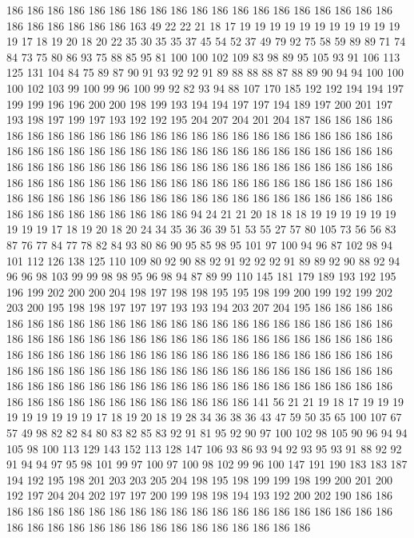 186 186 186 186 186 186 186 186 186 186 186 186 186 186 186 186 186 186 186 186
186 186 186 186 186 163 49 22 22 21 18 17 19 19 19 19 19 19 19 19
19 19 19 19 17 18 19 20 18 20 22 35 30 35 35 37 45 54 52 37
49 79 92 75 58 59 89 89 71 74 84 73 75 80 86 93 75 88 85 95
81 100 100 102 109 83 98 89 95 105 93 91 106 113 125 131 104 84 75 89
87 90 91 93 92 92 91 89 88 88 88 87 88 89 90 94 94 100 100 100
102 103 99 100 99 96 100 99 92 82 93 94 88 107 170 185 192 192 194 194
197 199 199 196 196 200 200 198 199 193 194 194 197 197 194 189 197 200 201 197
193 198 197 199 197 193 192 192 195 204 207 204 201 204 187 186 186 186 186 186
186 186 186 186 186 186 186 186 186 186 186 186 186 186 186 186 186 186 186 186
186 186 186 186 186 186 186 186 186 186 186 186 186 186 186 186 186 186 186 186
186 186 186 186 186 186 186 186 186 186 186 186 186 186 186 186 186 186 186 186
186 186 186 186 186 186 186 186 186 186 186 186 186 186 186 186 186 186 186 186
186 186 186 186 186 186 186 186 186 186 186 186 186 186 186 186 186 186 186 186
186 186 186 94 24 21 21 20 18 18 18 19 19 19 19 19 19 19 19 19
17 18 19 20 18 20 24 34 35 36 36 39 51 53 55 27 57 80 105 73
56 56 83 87 76 77 84 77 78 82 84 93 80 86 90 95 85 98 95 101
97 100 94 96 87 102 98 94 101 112 126 138 125 110 109 80 92 90 88 92
91 92 92 92 91 89 89 92 90 88 92 94 96 96 98 103 99 99 98 98
95 96 98 94 87 89 99 110 145 181 179 189 193 192 195 196 199 202 200 200
204 198 197 198 198 195 195 198 199 200 199 192 199 202 203 200 195 198 198 197
197 197 193 193 194 203 207 204 195 186 186 186 186 186 186 186 186 186 186 186
186 186 186 186 186 186 186 186 186 186 186 186 186 186 186 186 186 186 186 186
186 186 186 186 186 186 186 186 186 186 186 186 186 186 186 186 186 186 186 186
186 186 186 186 186 186 186 186 186 186 186 186 186 186 186 186 186 186 186 186
186 186 186 186 186 186 186 186 186 186 186 186 186 186 186 186 186 186 186 186
186 186 186 186 186 186 186 186 186 186 186 186 186 186 186 186 186 186 186 186
141 56 21 21 19 18 17 19 19 19 19 19 19 19 19 19 17 18 19 20
18 19 28 34 36 38 36 43 47 59 50 35 65 100 107 67 57 49 98 82
82 84 80 83 82 85 83 92 91 81 95 92 90 97 100 102 98 105 90 96
94 94 105 98 100 113 129 143 152 113 128 147 106 93 86 93 94 92 93 95
93 91 88 92 92 91 94 94 97 95 98 101 99 97 100 97 100 98 102 99
96 100 147 191 190 183 183 187 194 192 195 198 201 203 203 205 204 198 195 198
199 199 198 199 200 201 200 192 197 204 204 202 197 197 200 199 198 198 194 193
192 200 202 190 186 186 186 186 186 186 186 186 186 186 186 186 186 186 186 186
186 186 186 186 186 186 186 186 186 186 186 186 186 186 186 186 186 186 186 186
